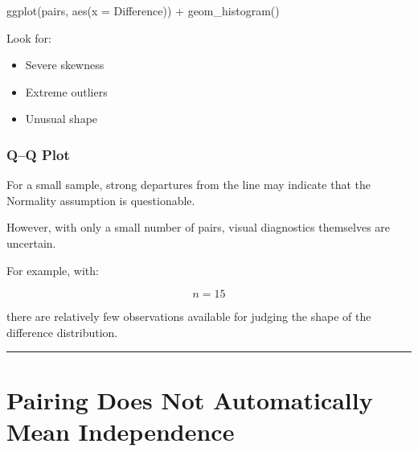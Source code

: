 \documentclass[
  letterpaper,
  DIV=11,
  numbers=noendperiod]{scrreprt}
\newenvironment{Shaded}{\begin{snugshade}}{\end{snugshade}}
\newcommand{\AttributeTok}[1]{\textcolor[rgb]{0.40,0.45,0.13}{#1}}
\newcommand{\FunctionTok}[1]{\textcolor[rgb]{0.28,0.35,0.67}{#1}}
\newcommand{\NormalTok}[1]{\textcolor[rgb]{0.00,0.23,0.31}{#1}}
\newcommand{\SpecialCharTok}[1]{\textcolor[rgb]{0.37,0.37,0.37}{#1}}
\providecommand{\tightlist}{%
  \setlength{\itemsep}{0pt}\setlength{\parskip}{0pt}}
\begin{document}
\begin{Shaded}
\begin{Highlighting}[]
\FunctionTok{ggplot}\NormalTok{(pairs, }\FunctionTok{aes}\NormalTok{(}\AttributeTok{x =}\NormalTok{ Difference)) }\SpecialCharTok{+}
    \FunctionTok{geom\_histogram}\NormalTok{()}
\end{Highlighting}
\end{Shaded}

Look for:

\begin{itemize}
\tightlist
\item
  Severe skewness
\item
  Extreme outliers
\item
  Unusual shape
\end{itemize}

\subsection{Q--Q Plot}\label{qq-plot}

\begin{Shaded}
\end{Shaded}

For a small sample, strong departures from the line may indicate that
the Normality assumption is questionable.

However, with only a small number of pairs, visual diagnostics
themselves are uncertain.

For example, with:

\[
n=15
\]

there are relatively few observations available for judging the shape of
the difference distribution.

\begin{center}\rule{0.5\linewidth}{0.5pt}\end{center}


\chapter{Pairing Does Not Automatically Mean
Independence}\label{pairing-does-not-automatically-mean-independence}
\end{document}
